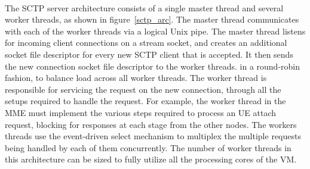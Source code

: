 \documentclass[hidelinks]{report}
\begin{document}
~\\ The SCTP server architecture consists of a single master thread and several worker threads, as shown in figure~\ref{sctp_arc}. The master thread communicates with each of the worker threads via a logical Unix pipe. The master thread listens for incoming client connections on a stream socket, and creates an additional socket file descriptor for every new SCTP client that is accepted. It then sends the new connection socket file descriptor to the worker threads. in a round-robin fashion, to balance load across all worker threads. The worker thread is responsible for servicing the request on the new connection, through all the setups required to handle the request. For example, the worker thread in the MME must implement the various steps required to process an UE attach request, blocking for responses at each stage from the other nodes. The workers threads use the event-driven select mechanism to multiplex the multiple requests being handled by each of them concurrently. The number of worker threads in this architecture can be sized to fully utilize all the processing cores of the VM.
\end{document}
